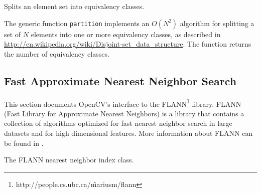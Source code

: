 Splits an element set into equivalency classes.

\begin{description}
\end{description}

The generic function \texttt{partition} implements an $O(N^2)$ algorithm for
splitting a set of $N$ elements into one or more equivalency classes, as described in \url{http://en.wikipedia.org/wiki/Disjoint-set_data_structure}. The function
returns the number of equivalency classes.

\subsection{Fast Approximate Nearest Neighbor Search}

This section documents OpenCV's interface to the FLANN\footnote{http://people.cs.ubc.ca/\~mariusm/flann} library. FLANN (Fast Library for Approximate Nearest Neighbors) is a library that
contains a collection of algorithms optimized for fast nearest neighbor search in large datasets and for high dimensional features. More 
information about FLANN can be found in \cite{muja_flann_2009}.

The FLANN nearest neighbor index class.

